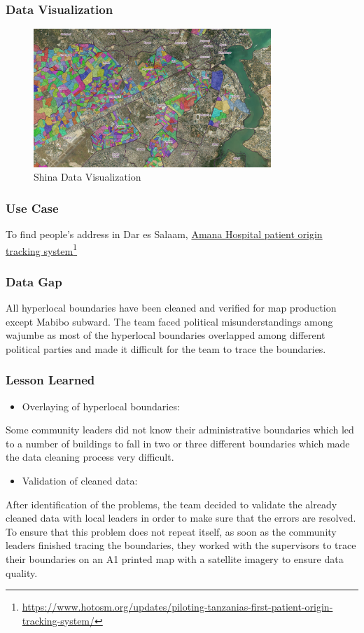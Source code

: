 \documentclass[a4paper,12pt,twoside]{article}
\begin{document}
\newpage
\subsubsection{Data Visualization}
\begin{figure}[h]
  \color{RHgreen}\caption{Shina Data Visualization}
  \centering
  \includegraphics[width=0.8\textwidth]{images/Shinas_Data_Viz.png}
\end{figure}
\subsubsection{Use Case}
To find people’s address in Dar es Salaam, \href{https://www.hotosm.org/updates/piloting-tanzanias-first-patient-origin-tracking-system/}{Amana Hospital patient origin tracking system}\footnote{\url{https://www.hotosm.org/updates/piloting-tanzanias-first-patient-origin-tracking-system/}}

\subsubsection{Data Gap}
All hyperlocal boundaries have been cleaned and verified for map production except Mabibo subward. The team faced political misunderstandings among wajumbe as most of the hyperlocal boundaries overlapped among different political parties and made it difficult for the team to trace the boundaries.

\subsubsection{Lesson Learned}
\begin{itemize}
    \item Overlaying of hyperlocal boundaries:
\end{itemize}
Some community leaders did not know their administrative boundaries which led to a number of buildings to fall in two or three different boundaries which made the data cleaning process very difficult.
\begin{itemize}
    \item Validation of cleaned data:
\end{itemize}
After identification of the problems, the team decided to validate the already cleaned data with local leaders in order to make sure that the errors are resolved. To ensure that this problem does not repeat itself, as soon as the community leaders finished tracing the boundaries, they worked with the supervisors to trace their boundaries on an A1 printed map with a satellite imagery to ensure data quality. 
\end{document}
